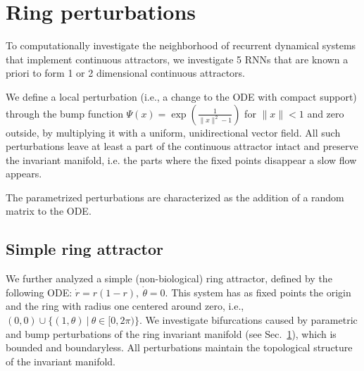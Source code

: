 \documentclass{article} %
\newcounter{ct}
\theoremstyle{definition}
\theoremstyle{remark}
\begin{document}
\newpage
\section{Ring perturbations}\label{sec:supp:ring_perturbations}


To computationally investigate the neighborhood of recurrent dynamical systems that implement continuous attractors, we investigate 5 RNNs that are known a priori to form 1 or 2 dimensional continuous attractors.

We define a local perturbation (i.e., a change to the ODE with compact support) through the bump function \(\Psi(x) = \exp\left(\frac{1}{\|x\|^2-1}\right)\) for \(\|x\|<1\) and zero outside, by multiplying it with a uniform, unidirectional vector field. All such perturbations leave at least a part of the continuous attractor intact and preserve the invariant manifold, i.e. the parts where the fixed points disappear a slow flow appears.

The parametrized perturbations are characterized as the addition of a random matrix to the ODE.





\subsection{Simple ring attractor}
We further analyzed a simple (non-biological)  ring attractor, defined by the following ODE: \(\dot r = r(1-r), \ \dot \theta = 0\).
This system has as fixed points the origin and the ring with radius one centered around zero, i.e., \((0,0)\cup\{(1,\theta)\ |\ \theta \in [0,2\pi)\}\). %
We investigate bifurcations caused by parametric and bump perturbations of the ring invariant manifold (see Sec.~\ref{sec:supp:ring_perturbations}), which is bounded and boundaryless.
All perturbations maintain the topological structure of the invariant manifold. %


\end{document}
